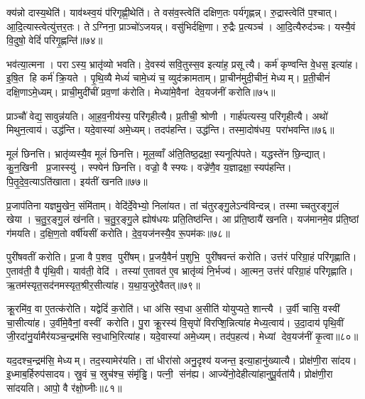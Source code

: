 क्य॑न्नो दास्य॒थेति॑। याव॑थ्स्व॒यं प॑रिगृह्णी॒थेति॑। ते वस॑व॒स्त्वेति॑ दक्षिण॒तः पर्य॑गृह्णन्न्। रु॒द्रास्त्वेति॑ प॒श्चात्। आ॒दि॒त्यास्त्वेत्यु॑त्तर॒तः। तेऽग्निना॒ प्राञ्चो॑ऽजयन्न्। वसु॑भिर्दक्षि॒णा। रु॒द्रैः प्र॒त्यञ्च॑। आ॒दि॒त्यैरुद॑ञ्चः। यस्यै॒वं वि॒दुषो॒ वेदिं॑ परिगृ॒ह्णन्ति॑॥७४॥

भव॑त्या॒त्मना। पराऽस्य॒ भ्रातृ॑व्यो भवति। दे॒वस्य॑ सवि॒तुस्स॒व इत्या॑ह॒ प्रसूत्यै। कर्म॑ कृण्वन्ति वे॒धस॒ इत्या॑ह। इ॒षि॒त हि कर्म॑ क्रि॒यते। पृ॒थि॒व्यै मेध्यं॑ चामे॒ध्यं च॒ व्युद॑क्रामताम्। प्रा॒चीन॑मुदी॒चीनं॒ मेध्यम्। प्र॒ती॒चीनं॑ दक्षि॒णाऽमे॒ध्यम्। प्राची॒मुदी॑चीं प्रव॒णां क॑रोति। मेध्या॑मे॒वैनां देव॒यज॑नीं करोति॥७५॥

प्राञ्चौ॑ वेद्य॒सावुन्न॑यति। आ॒ह॒व॒नीय॑स्य॒ परि॑गृहीत्यै। प्र॒तीची॒ श्रोणी। गार्ह॑पत्यस्य॒ परि॑गृहीत्यै। अथो॑ मिथुन॒त्वाय॑। उद्ध॑न्ति। यदे॒वास्या॑ अमे॒ध्यम्। तदप॑हन्ति। उद्ध॑न्ति। तस्मा॒दोष॑धय॒ परा॑भवन्ति॥७६॥

मूलं॑ छिनत्ति। भ्रातृ॑व्यस्यै॒व मूलं॑ छिनत्ति। मूल॒व्वाँ अ॑ति॒तिष्ठ॒द्रक्षा॒स्यनूत्पि॑पते। यद्धस्ते॑न छि॒न्द्यात्। कु॒न॒खिनी प्र॒जास्स्यु॑। स्फ्येन॑ छिनत्ति। वज्रो॒ वै स्फ्यः। वज्रे॑णै॒व य॒ज्ञाद्रक्षा॒स्यप॑हन्ति। पि॒तृ॒दे॒व॒त्याऽति॑खाता। इय॑तीं खनति॥७७॥

प्र॒जाप॑तिना यज्ञमु॒खेन॒ संमि॑ताम्। वेदि॑र्दे॒वेभ्यो॒ निला॑यत। तां च॑तुरङ्गु॒लेऽन्व॑विन्दन्न्। तस्माच्चतुरङ्गु॒लं खेया। च॒तु॒र॒ङ्गु॒लं ख॑नति। च॒तु॒र॒ङ्गु॒ले ह्योष॑धयः प्रति॒तिष्ठ॑न्ति। आ प्र॑ति॒ष्ठायै॑ खनति। यज॑मानमे॒व प्र॑ति॒ष्ठां ग॑मयति। द॒क्षि॒ण॒तो वर्\mbox{}षी॑यसीं करोति। दे॒व॒यज॑नस्यै॒व रू॒पम॑कः॥७८॥

पुरी॑षवतीं करोति। प्र॒जा वै प॒शव॒ पुरी॑षम्। प्र॒जयै॒वैनं॑ प॒शुभि॒ पुरी॑षवन्तं करोति। उत्त॑रं परिग्रा॒हं परि॑गृह्णाति। ए॒ताव॑ती॒ वै पृ॑थि॒वी। याव॑ती॒ वेदि॑। तस्या॑ ए॒तावत॑ ए॒व भ्रातृ॑व्यं नि॒र्भज्य॑। आ॒त्मन॒ उत्त॑रं परिग्रा॒हं परि॑गृह्णाति। ऋ॒तम॑स्यृत॒सद॑नमस्यृत॒श्रीर॒सीत्या॑ह। य॒था॒य॒जुरे॒वैतत्॥७९॥

क्रू॒रमि॑व॒ वा ए॒तत्क॑रोति। यद्वेदिं॑ क॒रोति॑। धा अ॑सि स्व॒धा अ॒सीति॑ योयुप्यते॒ शान्त्यै। उ॒र्वी चासि॒ वस्वी॑ चा॒सीत्या॑ह। उ॒र्वीमे॒वैनां॒ वस्वीं करोति। पु॒रा क्रू॒रस्य॑ वि॒सृपो॑ विरप्शि॒न्नित्या॑ह मेध्य॒त्वाय॑। उ॒दा॒दाय॑ पृथि॒वीं जी॒रदा॑नु॒र्यामैर॑यञ्च॒न्द्रम॑सि स्व॒धाभि॒रित्या॑ह। यदे॒वास्या॑ अमे॒ध्यम्। तद॑प॒हत्य॑। मेध्यां देव॒यज॑नीं कृ॒त्वा॥८०॥

यद॒दश्च॒न्द्रम॑सि॒ मेध्यम्। तद॒स्यामेर॑यति। तां धीरा॑सो अनु॒दृश्य॑ यजन्त॒ इत्या॒हानु॑ख्यात्यै। प्रोक्ष॑णी॒रा सा॑दय। इ॒ध्माब॒र्\mbox{}हिरुप॑सादय। स्रु॒वं च॒ स्रुच॑श्च॒ संमृ॑ड्ढि। पत्नी॒ संन॑ह्य। आज्ये॑नो॒देहीत्या॑हानुपू॒र्वता॑यै। प्रोक्ष॑णी॒रा सा॑दयति। आपो॒ वै र॑क्षो॒घ्नीः॥८१॥

